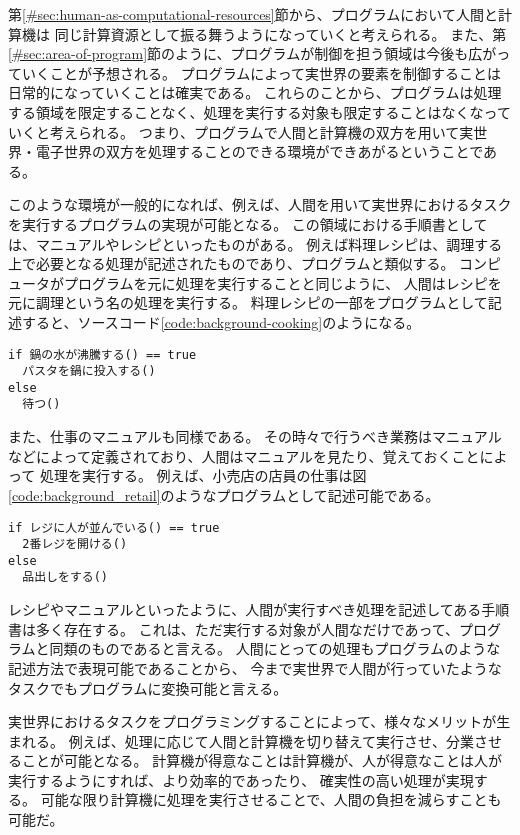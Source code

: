 第\ref{#sec:human-as-computational-resources}節から、プログラムにおいて人間と計算機は
同じ計算資源として振る舞うようになっていくと考えられる。
また、第\ref{#sec:area-of-program}節のように、プログラムが制御を担う領域は今後も広がっていくことが予想される。
プログラムによって実世界の要素を制御することは日常的になっていくことは確実である。
これらのことから、プログラムは処理する領域を限定することなく、処理を実行する対象も限定することはなくなっていくと考えられる。
つまり、プログラムで人間と計算機の双方を用いて実世界・電子世界の双方を処理することのできる環境ができあがるということである。

このような環境が一般的になれば、例えば、人間を用いて実世界におけるタスクを実行するプログラムの実現が可能となる。
この領域における手順書としては、マニュアルやレシピといったものがある。
例えば料理レシピは、調理する上で必要となる処理が記述されたものであり、プログラムと類似する。
コンピュータがプログラムを元に処理を実行することと同じように、
人間はレシピを元に調理という名の処理を実行する。
料理レシピの一部をプログラムとして記述すると、ソースコード\ref{code:background-cooking}のようになる。

\begin{lstlisting}[caption=料理レシピの一部の擬似コードで表す, label=code:background-cooking]
if 鍋の水が沸騰する() == true
  パスタを鍋に投入する()
else
  待つ()
\end{lstlisting}

また、仕事のマニュアルも同様である。
その時々で行うべき業務はマニュアルなどによって定義されており、人間はマニュアルを見たり、覚えておくことによって
処理を実行する。
例えば、小売店の店員の仕事は図\ref{code:background_retail}のようなプログラムとして記述可能である。

\begin{lstlisting}[caption=小売店の店員の挙動の一部を擬似コードで表す, label=code:background-retail]
if レジに人が並んでいる() == true
  2番レジを開ける()
else
  品出しをする()
\end{lstlisting}

レシピやマニュアルといったように、人間が実行すべき処理を記述してある手順書は多く存在する。
これは、ただ実行する対象が人間なだけであって、プログラムと同類のものであると言える。
人間にとっての処理もプログラムのような記述方法で表現可能であることから、
今まで実世界で人間が行っていたようなタスクでもプログラムに変換可能と言える。

実世界におけるタスクをプログラミングすることによって、様々なメリットが生まれる。
例えば、処理に応じて人間と計算機を切り替えて実行させ、分業させることが可能となる。
計算機が得意なことは計算機が、人が得意なことは人が実行するようにすれば、より効率的であったり、
確実性の高い処理が実現する。
可能な限り計算機に処理を実行させることで、人間の負担を減らすことも可能だ。

